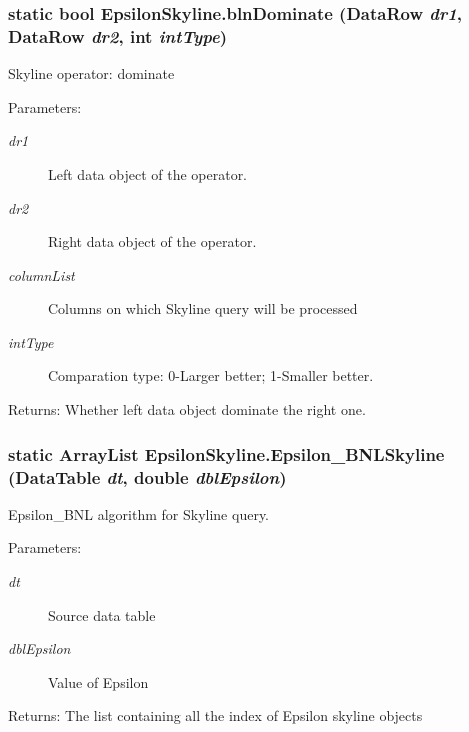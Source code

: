 \subsubsection{\setlength{\rightskip}{0pt plus 5cm}static bool Epsilon\-Skyline.bln\-Dominate (Data\-Row {\em dr1}, Data\-Row {\em dr2}, int {\em int\-Type})\hspace{0.3cm}{\tt  [static, private]}}\label{class_epsilon_skyline_7a1f69b965a81d949bcca3e603e8a086}


Skyline operator: dominate

\begin{Desc}
\item[Parameters:]
\begin{description}
\item[{\em dr1}]Left data object of the operator.\item[{\em dr2}]Right data object of the operator.\item[{\em column\-List}]Columns on which Skyline query will be processed\item[{\em int\-Type}]Comparation type: 0-Larger better; 1-Smaller better.\end{description}
\end{Desc}
\begin{Desc}
\item[Returns:]Whether left data object dominate the right one.\end{Desc}
\subsubsection{\setlength{\rightskip}{0pt plus 5cm}static Array\-List Epsilon\-Skyline.Epsilon\_\-BNLSkyline (Data\-Table {\em dt}, double {\em dbl\-Epsilon})\hspace{0.3cm}{\tt  [static, private]}}\label{class_epsilon_skyline_c15de88b5212b3d33540db2192cf2cc8}


Epsilon\_\-BNL algorithm for Skyline query. 

\begin{Desc}
\item[Parameters:]
\begin{description}
\item[{\em dt}]Source data table\item[{\em dbl\-Epsilon}]Value of Epsilon\end{description}
\end{Desc}
\begin{Desc}
\item[Returns:]The list containing all the index of Epsilon skyline objects\end{Desc}
